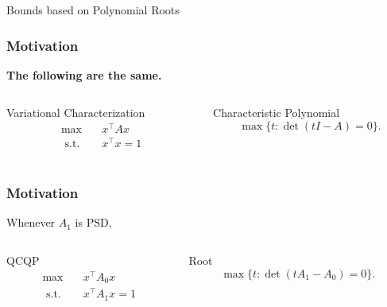 \documentclass{beamer}
\newcommand{\st}{{\text{ s.t. }}}
\begin{document}
\begin{frame}
    \centering
    \huge
    {\color{gray}Bounds based on Polynomial Roots}
\end{frame}
\begin{frame}
    \frametitle{Motivation}
    \textbf{The following are the same.}
    \vspace{0.3in}
    \begin{columns}
        \begin{column}{0.48\textwidth}
            \begin{block}{Variational Characterization}
            \begin{equation*}
                \begin{aligned}
                    \max\quad & x^{\intercal}Ax\\
                    \st & x^{\intercal}x = 1\\
                \end{aligned}
            \end{equation*}
            \end{block}
        \end{column}
        \pause
        \begin{column}{0.48\textwidth}
            \begin{block}{Characteristic Polynomial}
            \[
                \max \{t : \det(tI - A) = 0\}.
            \]
            \end{block}
        \end{column}
    \end{columns}
\end{frame}
\begin{frame}
    \frametitle{Motivation}
    Whenever $A_1$ is PSD,
    \vspace{0.3in}
    \begin{columns}
        \begin{column}{0.48\textwidth}
            \begin{block}{QCQP}
            \begin{equation*}
                \begin{aligned}
                    \max\quad & x^{\intercal}A_0x\\
                    \st & x^{\intercal}A_1x = 1\\
                \end{aligned}
            \end{equation*}
            \end{block}
        \end{column}
        \begin{column}{0.48\textwidth}
            \begin{block}{Root}
            \[
                \max \{t : \det(tA_1 - A_0) = 0\}.
            \]
            \end{block}
        \end{column}
    \end{columns}
\end{frame}
\end{document}
